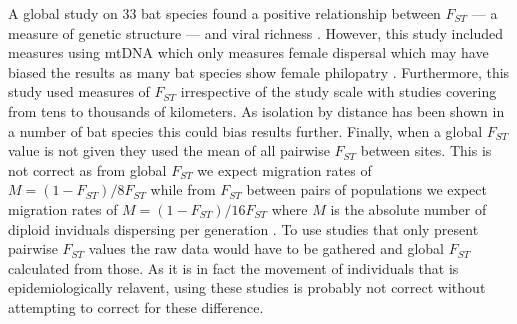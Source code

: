 A global study on 33 bat species found a positive relationship between $F_{ST}$ --- a measure of genetic structure --- and viral richness \cite{turmelle2009correlates}. 
However, this study included measures using mtDNA which only measures female dispersal which may have biased the results as many bat species show female philopatry \cite{kerth2002extreme, hulva2010mechanisms}.
Furthermore, this study used measures of $F_{ST}$ irrespective of the study scale with studies covering from tens \cite{mccracken1981social} to thousands \cite{petit1999male} of kilometers.
As isolation by distance has been shown in a number of bat species \cite{burland1999population, hulva2010mechanisms, o2015genetic, vonhof2015range} this could bias results further.
Finally, when a global $F_{ST}$ value is not given they used the mean of all pairwise $F_{ST}$ between sites.
This is not correct as from global $F_{ST}$ we expect migration rates of $M = (1-F_{ST})/8F_{ST}$ while from $F_{ST}$ between pairs of populations we expect migration rates of $M = (1-F_{ST})/16F_{ST}$ where $M$ is the absolute number of diploid inviduals dispersing per generation \cite{slatkin1995measure}.
To use studies that only present pairwise $F_{ST}$ values the raw data would have to be gathered and global $F_{ST}$ calculated from those.
As it is in fact the movement of individuals that is epidemiologically relavent, using these studies is probably not correct without attempting to correct for these difference.
\fussy



